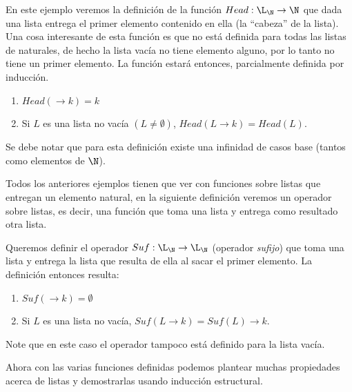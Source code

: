 \begin{ejemplo}
En este ejemplo veremos la definición de la función $Head:\L_\N\rightarrow\N$ que dada una lista entrega el primer elemento contenido en ella (la ``cabeza'' de la lista).
Una cosa interesante de esta función es que no está definida para todas las listas de naturales, de hecho la lista vacía no tiene elemento alguno, por lo tanto no tiene un primer elemento.
La función estará entonces, parcialmente definida por inducción.
\begin{enumerate}
\itemsep 0pt
\item $Head(\rightarrow k)=k$
\item Si $L$ es una lista no vacía $(L\not=\emptyset)$, $Head(L\rightarrow k)=Head(L)$.
\end{enumerate}
Se debe notar que para esta definición existe una infinidad de casos base (tantos como elementos de $\N$).
\end{ejemplo}

Todos los anteriores ejemplos tienen que ver con funciones sobre listas que entregan un elemento natural, en la siguiente definición veremos un operador sobre listas, es decir, una función que toma una lista y entrega como resultado otra lista.

\begin{ejemplo}
Queremos definir el operador $Suf:\L_\N\rightarrow\L_\N$ (operador \emph{sufijo}) que toma una lista y entrega la lista que resulta de ella al sacar el primer elemento.
La definición entonces resulta:
\begin{enumerate}
\itemsep 0pt
\item $Suf(\rightarrow k)=\emptyset$
\item Si $L$ es una lista no vacía, $Suf(L\rightarrow k)=Suf(L)\rightarrow k$.
\end{enumerate}
Note que en este caso el operador tampoco está definido para la lista vacía.
\end{ejemplo}

Ahora con las varias funciones definidas podemos plantear muchas propiedades acerca de listas y demostrarlas usando inducción estructural.

